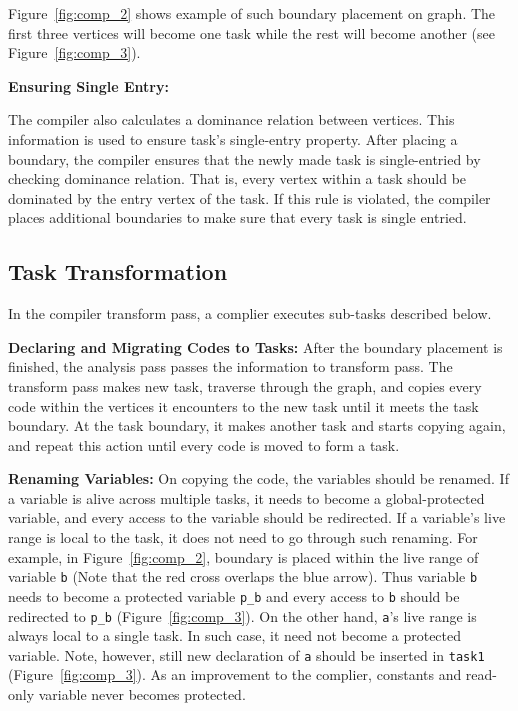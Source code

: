 Figure~\ref{fig:comp_2} shows example of such boundary placement on graph. The first three vertices will become one task while the rest will become another (see Figure~\ref{fig:comp_3}).

\textbf{Ensuring Single Entry:} 

The compiler also calculates a dominance relation  between vertices. This information is used to ensure task's
single-entry property.  After placing a boundary, the compiler ensures that the
newly made task is single-entried by checking dominance relation. That is,
every vertex within a task should be dominated by the entry vertex of the task.
If this rule is violated, the compiler places additional boundaries to make
sure that every task is single entried.

\subsection{Task Transformation}
\label{sec:compiler_transform_pass}

In the compiler transform pass, a complier executes sub-tasks described below.

\textbf{Declaring and Migrating Codes to Tasks:} After the boundary placement is finished, the analysis pass passes the information to transform pass. The transform pass makes new task, traverse through the graph, and copies every code within the vertices it encounters to the new task until it meets the task boundary. At the task boundary, it makes another task and starts copying again, and repeat this action until every code is moved to form a task.

\textbf{Renaming Variables:} On copying the code, the variables should be renamed. If a variable is alive across multiple tasks, it needs to become a global-protected variable, and every access to the variable should be redirected. If a variable's live range is local to the task, it does not need to go through such renaming. For example, in Figure~\ref{fig:comp_2}, boundary is placed within the live range of variable {\tt b} (Note that the red cross overlaps the blue arrow). Thus variable {\tt b} needs to become a protected variable {\tt p\_b} and every access to {\tt b} should be redirected to {\tt p\_b} (Figure~\ref{fig:comp_3}). On the other hand, {\tt a}'s live range is always local to a single task. In such case, it need not become a protected variable. Note, however, still new declaration of {\tt a} should be inserted in {\tt task1} (Figure~\ref{fig:comp_3}). As an improvement to the complier, constants and read-only variable never becomes protected.

